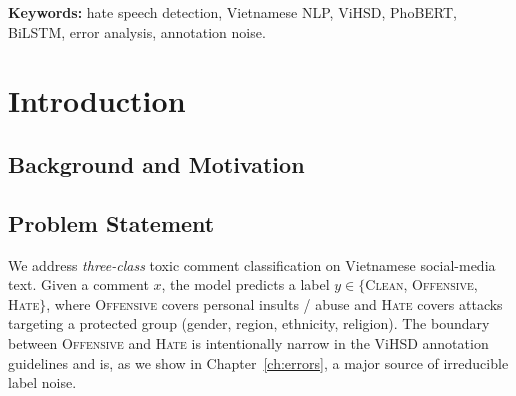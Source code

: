 \documentclass[a4paper,12pt,oneside]{report}
\begin{document}
\textbf{Keywords:} hate speech detection, Vietnamese NLP, ViHSD, PhoBERT,
BiLSTM, error analysis, annotation noise.

\tableofcontents
\listoffigures
\listoftables

\chapter{Introduction}
\label{ch:intro}

\section{Background and Motivation}

\section{Problem Statement}
We address \emph{three-class} toxic comment classification on Vietnamese
social-media text. Given a comment $x$, the model predicts a label
$y \in \{$\textsc{Clean}, \textsc{Offensive}, \textsc{Hate}$\}$,
where \textsc{Offensive} covers personal insults / abuse and \textsc{Hate}
covers attacks targeting a protected group (gender, region, ethnicity,
religion). The boundary between \textsc{Offensive} and \textsc{Hate}
is intentionally narrow in the ViHSD annotation guidelines and is, as we
show in Chapter~\ref{ch:errors}, a major source of irreducible label noise.
\end{document}
